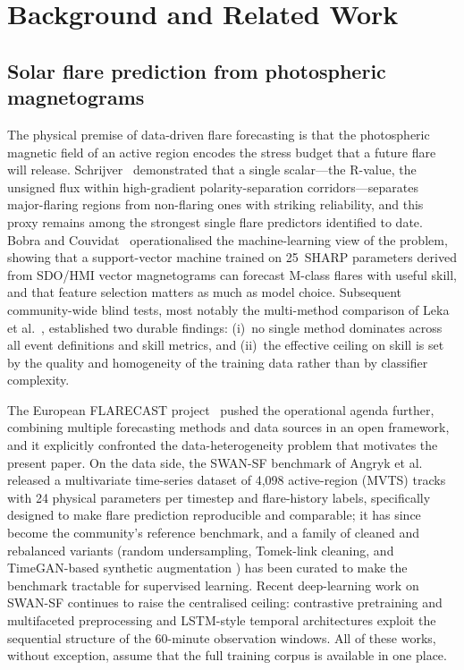 \section{Background and Related Work}\label{sec:related}

\subsection{Solar flare prediction from photospheric magnetograms}

The physical premise of data-driven flare forecasting is that the
photospheric magnetic field of an active region encodes the stress
budget that a future flare will release. Schrijver~\cite{schrijver2007}
demonstrated that a single scalar---the R-value, the unsigned flux
within high-gradient polarity-separation corridors---separates
major-flaring regions from non-flaring ones with striking reliability,
and this proxy remains among the strongest single flare predictors
identified to date. Bobra and Couvidat~\cite{bobra2015} operationalised
the machine-learning view of the problem, showing that a support-vector
machine trained on 25~SHARP parameters derived from SDO/HMI vector
magnetograms can forecast M-class flares with useful skill, and that
feature selection matters as much as model choice. Subsequent
community-wide blind tests, most notably the multi-method comparison of
Leka et al.~\cite{leka2019}, established two durable findings: (i)~no
single method dominates across all event definitions and skill
metrics, and (ii)~the effective ceiling on skill is set by the quality
and homogeneity of the training data rather than by classifier
complexity.

The European FLARECAST project~\cite{georgoulis2021} pushed the
operational agenda further, combining multiple forecasting methods and
data sources in an open framework, and it explicitly confronted the
data-heterogeneity problem that motivates the present paper. On the
data side, the SWAN-SF benchmark of Angryk et
al.~\cite{angryk2020} released a multivariate time-series dataset of
4{,}098 active-region (MVTS) tracks with 24 physical parameters per
timestep and flare-history labels, specifically designed to make flare
prediction reproducible and comparable; it has since become the
community's reference benchmark, and a family of cleaned and rebalanced
variants (random undersampling, Tomek-link cleaning, and TimeGAN-based
synthetic augmentation \cite{yoon2019}) has been curated to make the
benchmark tractable for supervised learning. Recent deep-learning work
on SWAN-SF continues to raise the centralised ceiling: contrastive
pretraining and multifaceted preprocessing \cite{eskandari2024} and
LSTM-style temporal architectures \cite{hassani2025} exploit the
sequential structure of the 60-minute observation windows. All of these
works, without exception, assume that the full training corpus is
available in one place.

